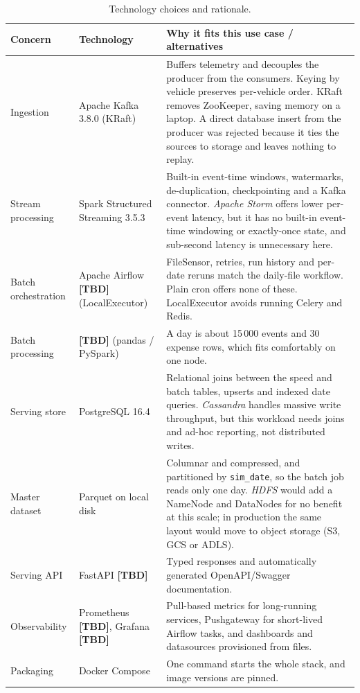 \documentclass[11pt,a4paper]{article}
\newcommand{\code}[1]{\texttt{\small #1}}
\newcommand{\tbd}{\textcolor{orange!80!black}{\textbf{[TBD]}}}
\begin{document}
\begin{table}[H]
\centering\small
\begin{tabularx}{\linewidth}{l l Y}
\toprule
\textbf{Concern} & \textbf{Technology} & \textbf{Why it fits this use case / alternatives} \\
\midrule
Ingestion & Apache Kafka 3.8.0 (KRaft) &
Buffers telemetry and decouples the producer from the consumers. Keying by vehicle preserves
per-vehicle order. KRaft removes ZooKeeper, saving memory on a laptop. A direct database insert
from the producer was rejected because it ties the sources to storage and leaves nothing to
replay. \\
Stream processing & Spark Structured Streaming 3.5.3 &
Built-in event-time windows, watermarks, de-duplication, checkpointing and a Kafka connector.
\emph{Apache Storm} offers lower per-event latency, but it has no built-in event-time windowing
or exactly-once state, and sub-second latency is unnecessary here. \\
Batch orchestration & Apache Airflow \tbd{} (LocalExecutor) &
FileSensor, retries, run history and per-date reruns match the daily-file workflow. Plain cron
offers none of these. LocalExecutor avoids running Celery and Redis. \\
Batch processing & \tbd{} (pandas / PySpark) &
A day is about 15\,000 events and 30 expense rows, which fits comfortably on one node. \\
Serving store & PostgreSQL 16.4 &
Relational joins between the speed and batch tables, upserts and indexed date queries.
\emph{Cassandra} handles massive write throughput, but this workload needs joins and ad-hoc
reporting, not distributed writes. \\
Master dataset & Parquet on local disk &
Columnar and compressed, and partitioned by \code{sim\_date}, so the batch job reads only one day.
\emph{HDFS} would add a NameNode and DataNodes for no benefit at this scale; in production the
same layout would move to object storage (S3, GCS or ADLS). \\
Serving API & FastAPI \tbd{} &
Typed responses and automatically generated OpenAPI/Swagger documentation. \\
Observability & Prometheus \tbd{}, Grafana \tbd{} &
Pull-based metrics for long-running services, Pushgateway for short-lived Airflow tasks, and
dashboards and datasources provisioned from files. \\
Packaging & Docker Compose &
One command starts the whole stack, and image versions are pinned. \\
\bottomrule
\end{tabularx}
\caption{Technology choices and rationale.}
\label{tab:stack}
\end{table}
\end{document}

